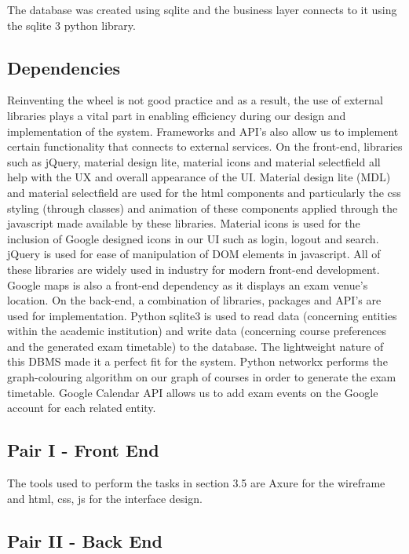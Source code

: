 \documentclass{article}
\begin{document}
The database was created using sqlite and the business layer connects to it using the sqlite 3 python library.

\subsection{Dependencies}

Reinventing the wheel is not good practice and as a result, the use of external libraries plays a vital part in enabling efficiency during our design and implementation of the system. Frameworks and API’s also allow us to implement certain functionality that connects to external services.
On the front-end, libraries such as jQuery, material design lite, material icons and material selectfield all help with the UX and overall appearance of the UI. Material design lite (MDL) and material selectfield are used for the html components and particularly the css styling (through classes) and animation of these components applied through the javascript made available by these libraries. Material icons is used for the inclusion of Google designed icons in our UI such as login, logout and search. jQuery is used for ease of manipulation of DOM elements in javascript. All of these libraries are widely used in industry for modern front-end development. Google maps is also a front-end dependency as it displays an exam venue’s location.
On the back-end, a combination of libraries, packages and API’s are used for implementation. Python sqlite3 is used to read data (concerning entities within the academic institution) and write data (concerning course preferences and the generated exam timetable) to the database. The lightweight nature of this DBMS made it a perfect fit for the system. Python networkx performs the graph-colouring algorithm on our graph of courses in order to generate the exam timetable. Google Calendar API allows us to add exam events on the Google account for each related entity.


\subsection{Pair I - Front End}

The tools used to perform the tasks in section 3.5 are Axure for the wireframe and html, css, js for the interface design.

\subsection{Pair II - Back End}
\end{document}
